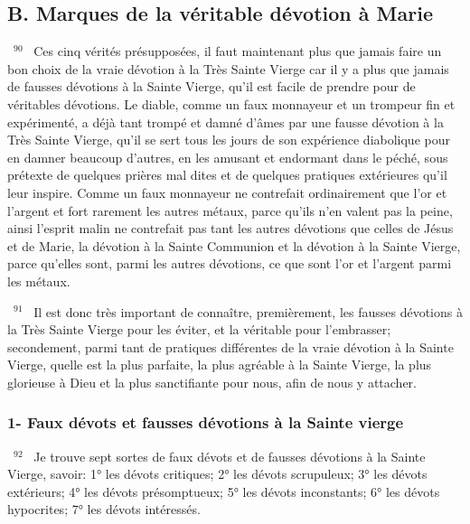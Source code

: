 \documentclass[paper=a5,pagesize=pdftex,fontsize=15pt,headinclude=on,twoside=off]{scrbook}
\newcommand{\negphantom}[1]{\settowidth{\dimen0}{#1}\hspace*{-\dimen0}}
\newcommand{\versenb}[1]{\par \vspace{10pt}~\negphantom{~${}^{#1}$~}${}^{#1}$~}
\begin{document}
\subsection{B. Marques de la véritable dévotion à Marie}
\versenb{90} Ces cinq vérités présupposées, il faut maintenant plus que jamais faire un bon choix de la vraie dévotion à la
Très Sainte Vierge car il y a plus que jamais de fausses dévotions à la Sainte Vierge, qu'il est facile de prendre
pour de véritables dévotions. Le diable, comme un faux monnayeur et un trompeur fin et expérimenté, a déjà tant
trompé et damné d'âmes par une fausse dévotion à la Très Sainte Vierge, qu'il se sert tous les jours de son
expérience diabolique pour en damner beaucoup d'autres, en les amusant et endormant dans le péché, sous
prétexte de quelques prières mal dites et de quelques pratiques extérieures qu'il leur inspire. Comme un faux
monnayeur ne contrefait ordinairement que l'or et l'argent et fort rarement les autres métaux, parce qu'ils n'en
valent pas la peine, ainsi l'esprit malin ne contrefait pas tant les autres dévotions que celles de Jésus et de Marie,
la dévotion à la Sainte Communion et la dévotion à la Sainte Vierge, parce qu'elles sont, parmi les autres
dévotions, ce que sont l'or et l'argent parmi les métaux.
\versenb{91} Il est donc très important de connaître, premièrement, les fausses dévotions à la Très Sainte Vierge pour les
éviter, et la véritable pour l'embrasser; secondement, parmi tant de pratiques différentes de la vraie dévotion à la
Sainte Vierge, quelle est la plus parfaite, la plus agréable à la Sainte Vierge, la plus glorieuse à Dieu et la plus
sanctifiante pour nous, afin de nous y attacher.
\subsubsection{1- Faux dévots et fausses dévotions à la Sainte vierge}
\versenb{92} Je trouve sept sortes de faux dévots et de fausses dévotions à la Sainte Vierge, savoir:
1° les dévots critiques;
2° les dévots scrupuleux;
3° les dévots extérieurs;
4° les dévots présomptueux;
5° les dévots inconstants;
6° les dévots hypocrites;
7° les dévots intéressés.
\end{document}
